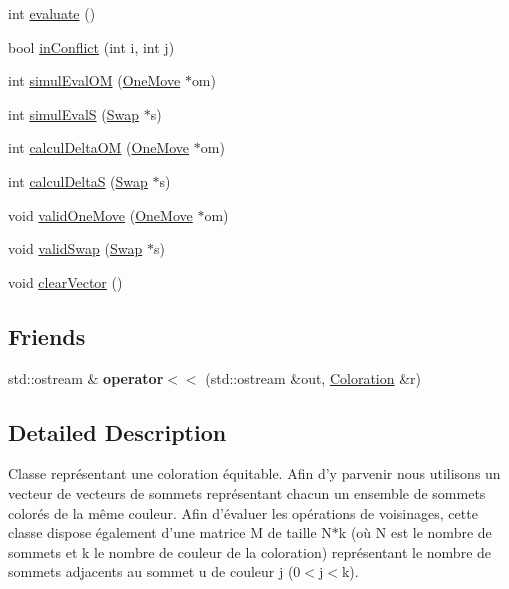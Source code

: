 \begin{DoxyCompactItemize}
int \hyperlink{classColoration_aca206c216d5d7bd46d391a7407dabc0c}{evaluate} ()
\item 
bool \hyperlink{classColoration_a0432b3075aa1856ef2ed65a3f1836a9a}{in\-Conflict} (int i, int j)
\item 
int \hyperlink{classColoration_a72244ae3ffa1f296f0245b84723d9cb1}{simul\-Eval\-O\-M} (\hyperlink{classOneMove}{One\-Move} $\ast$om)
\item 
int \hyperlink{classColoration_aad8064b03a899812cb647f36d9144be4}{simul\-Eval\-S} (\hyperlink{classSwap}{Swap} $\ast$s)
\item 
int \hyperlink{classColoration_ad96eae6de8105df79f5f14a4e7df3f44}{calcul\-Delta\-O\-M} (\hyperlink{classOneMove}{One\-Move} $\ast$om)
\item 
int \hyperlink{classColoration_a81b1294a308a39fb1561f60d0f1b5a79}{calcul\-Delta\-S} (\hyperlink{classSwap}{Swap} $\ast$s)
\item 
void \hyperlink{classColoration_a34b1962a13f56b9860efe66cf7ca4e58}{valid\-One\-Move} (\hyperlink{classOneMove}{One\-Move} $\ast$om)
\item 
void \hyperlink{classColoration_a7f66cf5cec21d5b3759a7ba48ce69f06}{valid\-Swap} (\hyperlink{classSwap}{Swap} $\ast$s)
\item 
void \hyperlink{classColoration_a3b633f79f54ca7a2cc34c693fba5743f}{clear\-Vector} ()
\end{DoxyCompactItemize}
\subsection*{Friends}
\begin{DoxyCompactItemize}
\item 
\hypertarget{classColoration_a1dd18fa54c9f6f6ac8578f86d3b2123a}{std\-::ostream \& {\bfseries operator$<$$<$} (std\-::ostream \&out, \hyperlink{classColoration}{Coloration} \&r)}\label{classColoration_a1dd18fa54c9f6f6ac8578f86d3b2123a}

\end{DoxyCompactItemize}


\subsection{Detailed Description}
Classe représentant une coloration équitable. Afin d'y parvenir nous utilisons un vecteur de vecteurs de sommets représentant chacun un ensemble de sommets colorés de la même couleur. Afin d'évaluer les opérations de voisinages, cette classe dispose également d'une matrice M de taille N$\ast$k (où N est le nombre de sommets et k le nombre de couleur de la coloration) représentant le nombre de sommets adjacents au sommet u de couleur j (0$<$j$<$k). 

